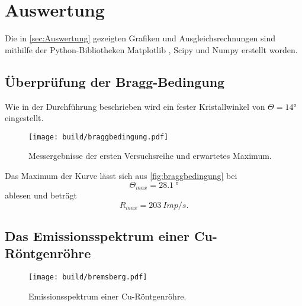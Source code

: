 \newpage
\section{Auswertung}
\label{sec:Auswertung}

Die in \autoref{sec:Auswertung} gezeigten Grafiken und Ausgleichsrechnungen sind mithilfe der Python-Bibliotheken Matplotlib \cite{matplotlib}, Scipy \cite{scipy} und Numpy \cite{numpy}
erstellt worden.

\subsection{Überprüfung der Bragg-Bedingung}

Wie in der Durchführung beschrieben wird ein fester Kristallwinkel von $\Theta = 14°$
eingestellt. 
\begin{figure}[H]
  \texttt{[image: build/braggbedingung.pdf]}
  \caption{Messergebnisse der ersten Versuchsreihe und erwartetes Maximum.}
  \label{fig:braggbedingung}
\end{figure}
Das Maximum der Kurve lässt sich aus \autoref{fig:braggbedingung} bei
\begin{equation*}
  \Theta_{max} = \SI{28.1}{°}
\end{equation*}
ablesen und beträgt
\begin{equation*}
  R_{max} = \SI{203}{Imp/s}.
\end{equation*}

\subsection{Das Emissionsspektrum einer Cu-Röntgenröhre}
\begin{figure}[H]
  \texttt{[image: build/bremsberg.pdf]}
  \caption{Emissionsspektrum einer Cu-Röntgenröhre.}
  \label{fig:spektrum}
\end{figure}

